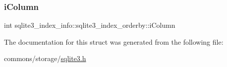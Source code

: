 \subsubsection{\texorpdfstring{iColumn}{iColumn}}
{\footnotesize\ttfamily int sqlite3\+\_\+index\+\_\+info\+::sqlite3\+\_\+index\+\_\+orderby\+::i\+Column}



The documentation for this struct was generated from the following file\+:\begin{DoxyCompactItemize}
\item 
commons/storage/\mbox{\hyperlink{sqlite3_8h}{sqlite3.\+h}}\end{DoxyCompactItemize}
